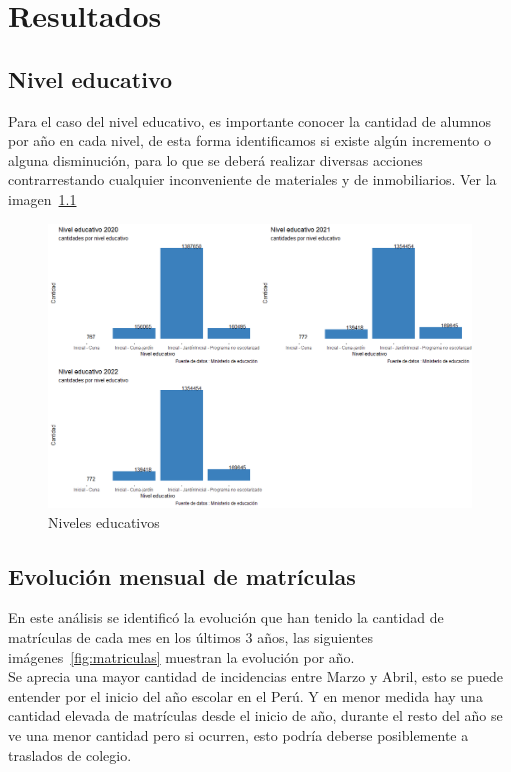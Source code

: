 \chapter{Resultados} %
\label{Chapter3 } %

\section{Nivel educativo}

Para el caso del nivel educativo, es importante conocer la cantidad de alumnos por año en cada nivel, de esta forma identificamos si existe algún incremento o alguna disminución, para lo que se deberá realizar diversas acciones contrarrestando cualquier inconveniente de materiales y de inmobiliarios. Ver la imagen~\ref{fig:niveleseducativos}

\begin{figure}[h]
\centering
\includegraphics[width=1.2\textwidth]{Figures/nivelesEducativos}
\decoRule
\caption[Nivel Educativo]{Niveles educativos}
\label{fig:niveleseducativos}
\end{figure}

\section{Evolución mensual de matrículas}\label{res_evolucion_matriculas}

En este análisis se identificó la evolución que han tenido la cantidad de matrículas de cada mes en los últimos 3 años, las siguientes imágenes~\ref{fig:matriculas} muestran la evolución por año.\\
Se aprecia una mayor cantidad de incidencias entre Marzo y Abril, esto se puede entender por el inicio del año escolar en el Perú. Y en menor medida hay una cantidad elevada de matrículas desde el inicio de año, durante el resto del año se ve una menor cantidad pero si ocurren, esto podría deberse posiblemente a traslados de colegio.

